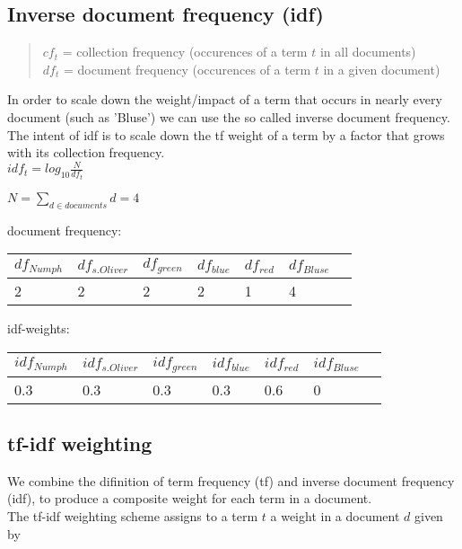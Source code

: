\subsection{Inverse document frequency (idf)}
\begin{quote}
    $cf_t$ = collection frequency (occurences of a term $t$ in all documents)\\
    $df_t$ = document frequency (occurences of a term $t$ in a given document)
\end{quote}
In order to scale down the weight/impact of a term that occurs in nearly every document (such as 'Bluse') we can use the so called inverse document frequency.\\
The intent of idf is to scale down the tf weight of a term by a factor that grows with its collection frequency.\\

$idf_t = log_{10}\frac{N}{df_{t}}$

\bigskip
$N = \displaystyle\sum_{d \in documents}{d} = 4$

\bigskip
\noindent
document frequency:\\
\begin{tabular}{ l l l l l l l }
    \textbf{$df_{Numph}$} & \textbf{$df_{s.Oliver}$} & \textbf{$df_{green}$} & \textbf{$df_{blue}$} & \textbf{$df_{red}$} & \textbf{$df_{Bluse}$}\\\hline
    2                     & 2                        & 2                     & 2                    & 1                   & 4\\
\end{tabular}

\bigskip
\noindent
idf-weights:\\
\begin{tabular}{ l l l l l l l }
    \textbf{$idf_{Numph}$} & \textbf{$idf_{s.Oliver}$} & \textbf{$idf_{green}$} & \textbf{$idf_{blue}$} & \textbf{$idf_{red}$} & \textbf{$idf_{Bluse}$}\\\hline
    0.3                    & 0.3                       & 0.3                    & 0.3                   & 0.6                  & 0
\end{tabular}


\subsection{tf-idf weighting}
We combine the difinition of term frequency (tf) and inverse document frequency (idf), to produce a composite weight for each term in a document.\\
The tf-idf weighting scheme assigns to a term $t$ a weight in a document $d$ given by\\


